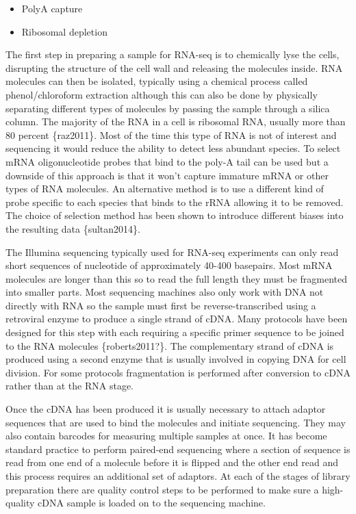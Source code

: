 \documentclass[11pt,a4paper,titlepage,twoside,openright]{style/unimelbthesis}
\theoremstyle{definition}
\theoremstyle{definition}
\theoremstyle{definition}
\theoremstyle{remark}
\begin{document}
\begin{mainmatter}
\begin{itemize}
\tightlist
\item
  PolyA capture
\item
  Ribosomal depletion
\end{itemize}

The first step in preparing a sample for RNA-seq is to chemically lyse the cells, disrupting the structure of the cell wall and releasing the molecules inside. RNA molecules can then be isolated, typically using a chemical process called phenol/chloroform extraction although this can also be done by physically separating different types of molecules by passing the sample through a silica column. The majority of the RNA in a cell is ribosomal RNA, usually more than 80 percent \{raz2011\}. Most of the time this type of RNA is not of interest and sequencing it would reduce the ability to detect less abundant species. To select mRNA oligonucleotide probes that bind to the poly-A tail can be used but a downside of this approach is that it won't capture immature mRNA or other types of RNA molecules. An alternative method is to use a different kind of probe specific to each species that binds to the rRNA allowing it to be removed. The choice of selection method has been shown to introduce different biases into the resulting data \{sultan2014\}.

The Illumina sequencing typically used for RNA-seq experiments can only read short sequences of nucleotide of approximately 40-400 basepairs. Most mRNA molecules are longer than this so to read the full length they must be fragmented into smaller parts. Most sequencing machines also only work with DNA not directly with RNA so the sample must first be reverse-transcribed using a retroviral enzyme to produce a single strand of cDNA. Many protocols have been designed for this step with each requiring a specific primer sequence to be joined to the RNA molecules \{roberts2011?\}. The complementary strand of cDNA is produced using a second enzyme that is usually involved in copying DNA for cell division. For some protocols fragmentation is performed after conversion to cDNA rather than at the RNA stage.

Once the cDNA has been produced it is usually necessary to attach adaptor sequences that are used to bind the molecules and initiate sequencing. They may also contain barcodes for measuring multiple samples at once. It has become standard practice to perform paired-end sequencing where a section of sequence is read from one end of a molecule before it is flipped and the other end read and this process requires an additional set of adaptors. At each of the stages of library preparation there are quality control steps to be performed to make sure a high-quality cDNA sample is loaded on to the sequencing machine.


\end{mainmatter}
\end{document}
